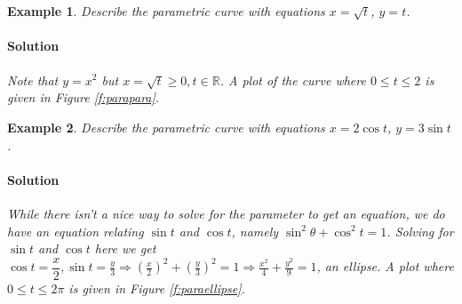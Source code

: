 \documentclass[letterpaper, 11pt, openany]{book}
\theoremstyle{mytheoremstyle}
\theoremstyle{myexamplestyle}
\newtheorem{example}{Example}[section]
\newenvironment{solution}{\paragraph{\sffamily \smaller \fontseries{b}\selectfont Solution}}{\hfill\faSquare}
\begin{document}
\begin{example}\label{e:parametricparabola}
    Describe the parametric curve with equations $x = \sqrt{t}$, $y=t$.
    \begin{solution}
        Note that $y = x^{2}$ but $x = \sqrt{t} \geq 0, t \in \mathbb{R}$. A plot of the curve where $0 \leq t \leq 2$ is given in Figure \ref{f:parapara}.
    \end{solution}      
\end{example}

\begin{example}\label{e:paraellipse}
    Describe the parametric curve with equations $x = 2\cos t$, $y= 3\sin t$.
    \begin{solution}
        While there isn't a nice way to solve for the parameter to get an equation, we do have an equation relating $\sin t$ and $\cos t$, namely $\sin^{2} \theta + \cos^{2} t  = 1$. Solving for $\sin t$ and $\cos t$ here we get $\displaystyle \cos t = \dfrac{x}{2}, \sin t = \frac{y}{3} \Rightarrow \left( \frac{x}{2} \right)^{2} + \left( \frac{y}{3} \right)^{2} = 1 \Rightarrow \frac{x^{2}}{4} + \frac{y^{2}}{9} = 1$, an ellipse. A plot where $0 \leq t \leq 2\pi$ is given in Figure \ref{f:paraellipse}. 
    \end{solution}
\end{example}
\end{document}
